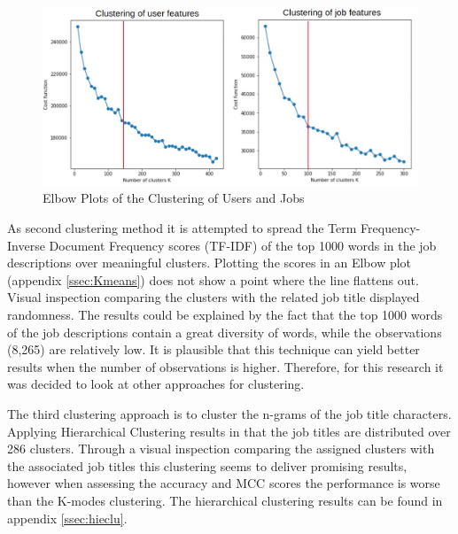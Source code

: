 \begin{figure}[H]
    \centering
    \includegraphics[width=\linewidth]{ThesisTemplate/Images/Clustering.png}
    \caption{\label{fig:eb} \footnotesize{Elbow Plots of the Clustering of Users and Jobs}}
\end{figure}

As second clustering method it is attempted to spread the Term Frequency-Inverse Document Frequency scores (TF-IDF) of the top 1000 words in the job descriptions over meaningful clusters.
Plotting the scores in an Elbow plot (appendix \ref{ssec:Kmeans}) does not show a point where the line flattens out.
Visual inspection comparing the clusters with the related job title displayed randomness.
The results could be explained by the fact that the top 1000 words of the job descriptions contain a great diversity of words, while the observations (8,265) are relatively low.
It is plausible that this technique can yield better results when the number of observations is higher.
Therefore, for this research it was decided to look at other approaches for clustering.

The third clustering approach is to cluster the n-grams of the job title characters.
Applying Hierarchical Clustering results in that the job titles are distributed over 286 clusters. 
Through a visual inspection comparing the assigned clusters with the associated job titles this clustering seems to deliver promising results, however when assessing the accuracy and MCC scores the performance is worse than the K-modes clustering.
The hierarchical clustering results can be found in appendix \ref{ssec:hieclu}.


